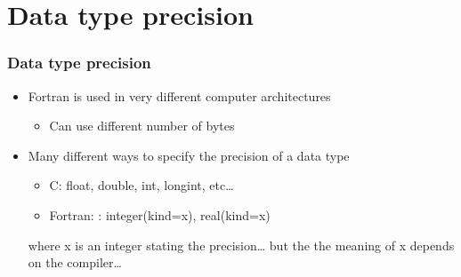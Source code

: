 
\subtitle{Lecture 3: More about data types}



\begin{frame}
  \titlepage
\end{frame}

\section{Data type precision}
\begin{frame}
  \frametitle{Data type precision}
  \begin{itemize}
  \item   Fortran is used in very different computer architectures
  \begin{itemize}
    \item Can use different number of bytes
  \end{itemize}
  \end{itemize}

  \begin{itemize}
  \item   Many different ways to specify the precision of a data type
  \begin{itemize}
    \item C: float, double, int, longint, etc…
    \item Fortran: : integer(kind=x), real(kind=x)
  \end{itemize}
  where x is an integer stating the precision… but the the meaning of x depends on the compiler…
  \end{itemize}
\end{frame}

